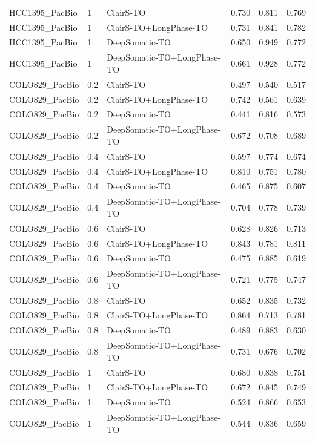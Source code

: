 \documentclass[pdflatex,sn-nature]{sn-jnl}
\begin{document}
{\begin{longtable}{@{}lllccc@{}}
  HCC1395\_PacBio & 1 & ClairS-TO & 0.730 & 0.811 & 0.769 \\
  HCC1395\_PacBio & 1 & ClairS-TO+LongPhase-TO & 0.731 & 0.841 & 0.782 \\
  HCC1395\_PacBio & 1 & DeepSomatic-TO & 0.650 & 0.949 & 0.772 \\
  HCC1395\_PacBio & 1 & DeepSomatic-TO+LongPhase-TO & 0.661 & 0.928 & 0.772 \\
  \addlinespace
  COLO829\_PacBio & 0.2 & ClairS-TO & 0.497 & 0.540 & 0.517 \\
  COLO829\_PacBio & 0.2 & ClairS-TO+LongPhase-TO & 0.742 & 0.561 & 0.639 \\
  COLO829\_PacBio & 0.2 & DeepSomatic-TO & 0.441 & 0.816 & 0.573 \\
  COLO829\_PacBio & 0.2 & DeepSomatic-TO+LongPhase-TO & 0.672 & 0.708 & 0.689 \\
  COLO829\_PacBio & 0.4 & ClairS-TO & 0.597 & 0.774 & 0.674 \\
  COLO829\_PacBio & 0.4 & ClairS-TO+LongPhase-TO & 0.810 & 0.751 & 0.780 \\
  COLO829\_PacBio & 0.4 & DeepSomatic-TO & 0.465 & 0.875 & 0.607 \\
  COLO829\_PacBio & 0.4 & DeepSomatic-TO+LongPhase-TO & 0.704 & 0.778 & 0.739 \\
  COLO829\_PacBio & 0.6 & ClairS-TO & 0.628 & 0.826 & 0.713 \\
  COLO829\_PacBio & 0.6 & ClairS-TO+LongPhase-TO & 0.843 & 0.781 & 0.811 \\
  COLO829\_PacBio & 0.6 & DeepSomatic-TO & 0.475 & 0.885 & 0.619 \\
  COLO829\_PacBio & 0.6 & DeepSomatic-TO+LongPhase-TO & 0.721 & 0.775 & 0.747 \\
  COLO829\_PacBio & 0.8 & ClairS-TO & 0.652 & 0.835 & 0.732 \\
  COLO829\_PacBio & 0.8 & ClairS-TO+LongPhase-TO & 0.864 & 0.713 & 0.781 \\
  COLO829\_PacBio & 0.8 & DeepSomatic-TO & 0.489 & 0.883 & 0.630 \\
  COLO829\_PacBio & 0.8 & DeepSomatic-TO+LongPhase-TO & 0.731 & 0.676 & 0.702 \\
  COLO829\_PacBio & 1 & ClairS-TO & 0.680 & 0.838 & 0.751 \\
  COLO829\_PacBio & 1 & ClairS-TO+LongPhase-TO & 0.672 & 0.845 & 0.749 \\
  COLO829\_PacBio & 1 & DeepSomatic-TO & 0.524 & 0.866 & 0.653 \\
  COLO829\_PacBio & 1 & DeepSomatic-TO+LongPhase-TO & 0.544 & 0.836 & 0.659 \\

\end{longtable}}
\end{document}
